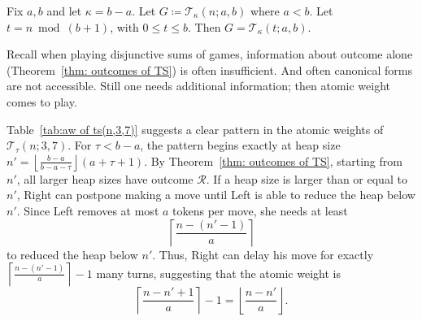 \documentclass[oneside,reqno]{amsart}
\newcommand{\ts}{\mathcal{T}}
\newcommand{\rp}{\mathscr{R}}
\begin{document}

\begin{theorem}\label{thm: CF periodicity in TS at b-a}
    Fix $a,b$ and let $\kappa =b-a$. Let $G\coloneq\ts_{\kappa}(n;a,b)$ where $a<b$. Let $t= n \bmod (b+1)$, with $0\le t\le b$. Then $G=\ts_{\kappa}(t;a,b)$. %
\end{theorem}

Recall when playing disjunctive sums of games, information about outcome alone (Theorem~\ref{thm: outcomes of TS}) is often insufficient. And often canonical forms are not accessible. Still one needs additional information; then atomic weight comes to play.

Table~\ref{tab:aw of ts(n,3,7)} suggests a clear pattern in the atomic weights of $\ts_\tau(n;3,7)$. For $\tau<b-a$, the pattern begins exactly at heap size
$n'=\left\lfloor\frac{b-a}{b-a-\tau}\right\rfloor\!(a+\tau+1)$. By Theorem~\ref{thm: outcomes of TS}, starting from $n'$, all larger heap sizes have outcome $\rp$. If a heap size is larger than or equal to $n'$, Right can postpone making a move until Left is able to reduce the heap below $n'$. Since Left removes at most $a$ tokens per move, she needs at least
\[
\left\lceil\frac{n-(n'-1)}{a}\right\rceil
\]
to reduced the heap below $n'$. Thus, Right can delay his move for exactly $\left\lceil\frac{n-(n'-1)}{a}\right\rceil-1$ many turns, suggesting that the atomic weight is
\[
\left\lceil\frac{n-n'+1}{a}\right\rceil-1=\left\lfloor\frac{n-n'}{a}\right\rfloor.
\] 
\end{document}
